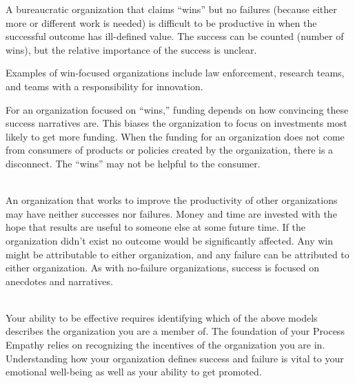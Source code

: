 A bureaucratic organization that claims ``wins'' but no failures (because either more or different work is needed) is difficult to be productive in when the successful outcome has ill-defined value. The success can be counted (number of wins), but the relative importance of the success is unclear.

Examples of win-focused organizations include law enforcement, research teams, and teams with a responsibility for innovation. 

For an organization focused on ``wins,'' funding depends on how convincing these success narratives are. This biases the organization to focus on investments most likely to get more funding. When the funding for an organization does not come from consumers of products or policies created by the organization, there is a disconnect. The ``wins'' may not be helpful to the consumer.


\ \\

An organization that works to improve the productivity of other organizations may have neither successes nor failures. Money and time are invested with the hope that results are useful to someone else at some future time. If the organization didn't exist no outcome would be significantly affected. Any win might be attributable to either organization, and any failure can be attributed to either organization. As with no-failure organizations, success is focused on anecdotes and narratives. 

\ \\

Your ability to be effective requires identifying which of the above models describes the organization you are a member of. The foundation of your Process Empathy relies on recognizing the incentives of the organization you are in.
Understanding how your organization defines success and failure is vital to your emotional well-being as well as your ability to get promoted. %